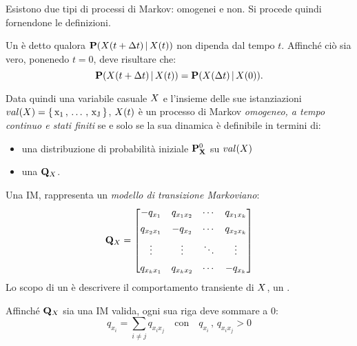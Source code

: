 Esistono due tipi di processi di Markov: omogenei e non. Si procede quindi fornendone le definizioni.

\begin{definizione}[\upcase\mprocess*{} \omog*{}]
\label{defn:homogeneus-markov-process}
Un \mprocess*{} è detto \emph{\omog*{}} qualora $\mathbf{P}(\mathnormal{X}(t + \Delta t)\,\arrowvert\,\mathnormal{X}(t))$ non dipenda dal tempo $t$. Affinché ciò sia vero, ponenedo $t=0$, deve risultare che:
\begin{equation}
\label{eq:homogeneus-markov-process}
\mathbf{P}(\mathnormal{X}(t + \Delta t)\,\arrowvert\,\mathnormal{X}(t))=\mathbf{P}(\mathnormal{X}(\Delta t)\,\arrowvert\,\mathnormal{X}(0))\text{.}
\end{equation}
\end{definizione}
Data quindi una variabile casuale $\mathnormal{X}$ e l'insieme delle sue istanziazioni $val(\mathnormal{X})=\{\,\mathrm{x_1}\,,\,\dotsc\,,\,\mathrm{x_J}\,\}$, $\mathnormal{X}(t)$ è un processo di Markov \emph{omogeneo, a tempo continuo e stati finiti} se e solo se la sua dinamica è definibile in termini di:
\begin{itemize}
    \item una distribuzione di probabilità iniziale $\mathbf{P}^0_{\mathbf{X}}$ su $val(\mathnormal{X})$
    \item una \im*{} $\mathbf{Q}_{\mathnormal{X}}$.
\end{itemize}

\begin{definizione}[\upcase\im*{}]
\label{defn:im}
Una \acf{IM}, rappresenta un \emph{modello di transizione Markoviano}:
\[
\mathbf{Q}_{\mathnormal{X}}=
\begin{bmatrix}
    -q_{x_1}    & q_{x_1x_2}& \cdots & q_{x_1x_k}   \\[0.5em]
    q_{x_2x_1}  & -q_{x_2}  & \cdots & q_{x_2x_k}   \\[0.5em]
    \vdots      & \vdots    & \ddots & \vdots       \\[0.5em]
    q_{x_kx_1}  & q_{x_kx_2}& \cdots & -q_{x_k}
\end{bmatrix}
\]
Lo scopo di un \im*{} è descrivere il comportamento transiente di $\mathnormal{X}$, un \mprocess*{} \omog*{}.
\end{definizione}

Affinché $\mathbf{Q}_{\mathnormal{X}}$ sia una \acl{IM} valida, ogni sua riga deve sommare a $0$:
\[
q_{x_i}=\sum_{i \neq j}q_{x_ix_j}\quad\text{con}\quad q_{x_i}\,,\,q_{x_ix_j}>0
\]

